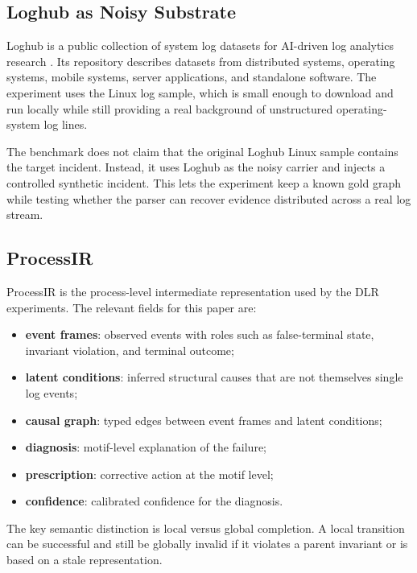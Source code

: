 \documentclass[11pt]{article}
\begin{document}
\subsection{Loghub as Noisy Substrate}

Loghub is a public collection of system log datasets for AI-driven log analytics
research \cite{loghub_repo,loghub_issre}. Its repository describes datasets
from distributed systems, operating systems, mobile systems, server
applications, and standalone software. The experiment uses the Linux log sample,
which is small enough to download and run locally while still providing a real
background of unstructured operating-system log lines.

The benchmark does not claim that the original Loghub Linux sample contains the
target incident. Instead, it uses Loghub as the noisy carrier and injects a
controlled synthetic incident. This lets the experiment keep a known gold graph
while testing whether the parser can recover evidence distributed across a real
log stream.

\subsection{ProcessIR}

ProcessIR is the process-level intermediate representation used by the DLR
experiments. The relevant fields for this paper are:

\begin{itemize}
  \item \textbf{event frames}: observed events with roles such as
  false-terminal state, invariant violation, and terminal outcome;
  \item \textbf{latent conditions}: inferred structural causes that are not
  themselves single log events;
  \item \textbf{causal graph}: typed edges between event frames and latent
  conditions;
  \item \textbf{diagnosis}: motif-level explanation of the failure;
  \item \textbf{prescription}: corrective action at the motif level;
  \item \textbf{confidence}: calibrated confidence for the diagnosis.
\end{itemize}

The key semantic distinction is local versus global completion. A local
transition can be successful and still be globally invalid if it violates a
parent invariant or is based on a stale representation.
\end{document}
